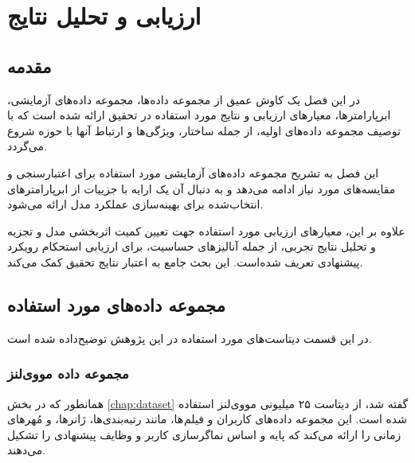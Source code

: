 \chapter{ارزیابی و تحلیل نتایج}
\label{chap:results}
\section{مقدمه} 
در این فصل یک کاوش عمیق از مجموعه داده‌ها، مجموعه داده‌های آزمایشی، ابرپارامترها، معیارهای ارزیابی و نتایج مورد استفاده در تحقیق ارائه شده است که با توصیف مجموعه داده‌های اولیه، از جمله ساختار، ویژگی‌ها و ارتباط آنها با حوزه شروع می‌گردد. 

این فصل به تشریح مجموعه داده‌های آزمایشی مورد استفاده برای اعتبارسنجی و مقایسه‌های مورد نیاز ادامه می‌دهد و به دنبال آن یک ارایه با جزییات از ابرپارامترهای انتخاب‌شده برای بهینه‌سازی عملکرد مدل ارائه می‌شود. 

علاوه بر این، معیارهای ارزیابی مورد استفاده جهت تعیین کمیت اثربخشی مدل و تجزیه و تحلیل نتایج تجربی، از جمله آنالیز‌های حساسیت، برای ارزیابی استحکام رویکرد پیشنهادی تعریف شده‌است. این بحث جامع به اعتبار نتایج تحقیق کمک می‌کند.

\section{مجموعه داده‌های مورد استفاده}
در این قسمت دیتاست‌های مورد استفاده در این پژوهش توضیح‌داده شده است.


\subsection{مجموعه داده مووی‌لنز} 
همانطور که در بخش 
\ref{chap:dataset}
گفته شد، از دیتاست ۲۵ میلیونی مووی‌لنز استفاده شده است. این مجموعه داده‌های کاربران و فیلم ها، مانند رتبه‌بندی‌ها، ژانرها، و مُهرهای زمانی را ارائه می‌کند که پایه و اساس نماگر‌سازی کاربر و وظایف پیشنهادی را تشکیل می‌دهند.

